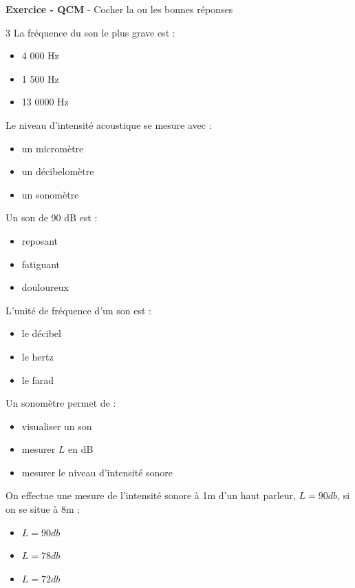 \documentclass[11pt,a4paper]{article}
\begin{document}
\textbf{Exercice - QCM} -
Cocher la ou les bonnes réponses\\
\begin{multicols}{3}
 La fréquence du son le plus grave est  : 
\begin{itemize}[label=$\square$]
	\item 4 000 Hz
	\item 1 500 Hz
	\item 13 0000 Hz
\end{itemize}

\vspace{2mm}

 Le niveau d'intensité acoustique se mesure avec  : 
\begin{itemize}[label=$\square$]
	\item un micromètre
	\item un décibelomètre
	\item un sonomètre
\end{itemize}

\vspace{2mm}

 Un son de 90 dB est : 
\begin{itemize}[label=$\square$]
	\item reposant
	\item fatiguant
	\item douloureux
\end{itemize}

\vspace{5mm}


 L'unité de fréquence d'un son est  : 
\begin{itemize}[label=$\square$]
	\item le décibel
	\item le hertz
	\item le farad 
\end{itemize}


 Un sonomètre permet de  : 
\begin{itemize}[label=$\square$]
	\item visualiser un son
	\item mesurer $L$ en dB
	\item mesurer le niveau d'intensité sonore
\end{itemize}

 On effectue une mesure de l'intensité sonore à 1m d'un haut parleur, $L = 90db$, si on se situe à 8m  : 
\begin{itemize}[label=$\square$]
	\item $L = 90 db$
	\item $L = 78 db$
	\item $L = 72 db$
\end{itemize}


\end{multicols}
\end{document}
